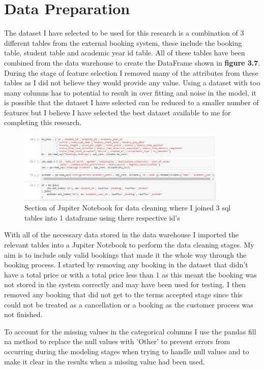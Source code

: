 \section{Data Preparation}

The dataset I have selected to be used for this research is a combination of 3 different tables from the external booking system, these include the booking table, student table and academic year id table. All of these tables have been combined from the data warehouse to create the DataFrame shown in \textbf{figure 3.7}. During the stage of feature selection I removed many of the attributes from these tables as I did not believe they would provide any value. Using a dataset with too many columns has to potential to result in over fitting and noise in the model, it is possible that the dataset I have selected can be reduced to a smaller number of features but I believe I have selected the best dataset available to me for completing this research. 

\begin{figure}[H]
 \includegraphics[width=10cm]{figures/joining_tables.png}
 \caption{Section of Jupiter Notebook for data cleaning where I joined 3 sql tables into 1 dataframe using there respective id's}
\end{figure}

With all of the necessary data stored in the data warehouse I imported the relevant tables into a Jupiter Notebook to perform the data cleaning stages. My aim is to include only valid bookings that made it the whole way through the booking process. I started by removing any booking in the dataset that didn't have a total price or with a total price less than 1 as this meant the booking was not stored in the system correctly and may have been used for testing. I then removed any booking that did not get to the terms accepted stage since this could not be treated as a cancellation or a booking as the customer process was not finished.

To account for the missing values in the categorical columns I use the pandas fill na method to replace the null values with 'Other'  to prevent errors from occurring during the modeling stages when trying to handle null values and to make it clear in the results when a missing value had been used.

